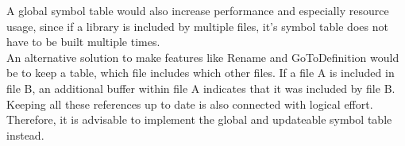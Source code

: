 A global symbol table would also increase performance and especially resource usage, since if a library is included by multiple files, it's symbol table does not have to be built multiple times.\\

An alternative solution to make features like Rename and GoToDefinition would be to keep a table, which file includes which other files.
If a file A is included in file B, an additional buffer within file A indicates that it was included by file B.
Keeping all these references up to date is also connected with logical effort.
Therefore, it is advisable to implement the global and updateable symbol table instead.

